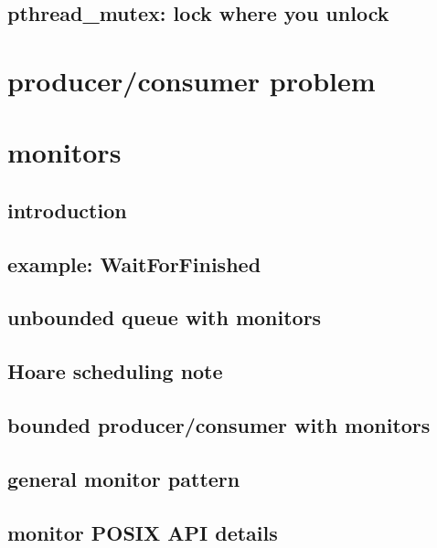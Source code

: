 \subsection{pthread\_mutex: lock where you unlock}


\section{producer/consumer problem}


\section{monitors}

\subsection{introduction}

\subsection{example: WaitForFinished}


\subsection{unbounded queue with monitors}


\subsection{Hoare scheduling note}


\subsection{bounded producer/consumer with monitors}
 

\subsection{general monitor pattern}


\subsection{monitor POSIX API details}


